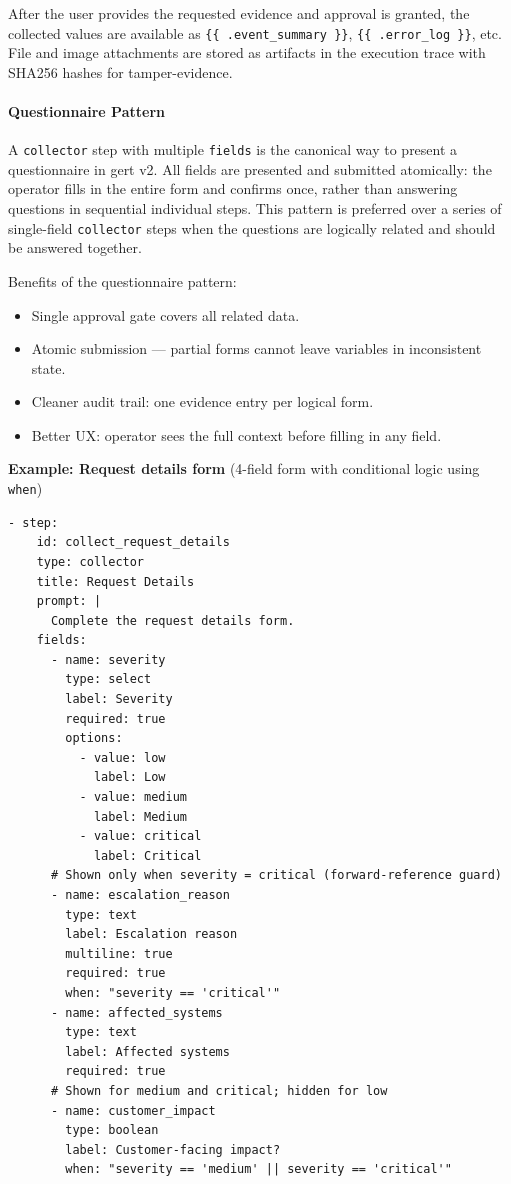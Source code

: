 After the user provides the requested evidence and approval is granted, the
collected values are available as \texttt{\{\{ .event\_summary \}\}},
\texttt{\{\{ .error\_log \}\}}, etc.  File and image attachments are stored as
artifacts in the execution trace with SHA256 hashes for tamper-evidence.

\paragraph{Questionnaire Pattern}
\label{par:questionnaire-pattern}

A \texttt{collector} step with multiple \texttt{fields} is the canonical way
to present a questionnaire in gert v2.  All fields are presented and submitted
atomically: the operator fills in the entire form and confirms once, rather than
answering questions in sequential individual steps.  This pattern is preferred
over a series of single-field \texttt{collector} steps when the questions are
logically related and should be answered together.

Benefits of the questionnaire pattern:
\begin{itemize}
  \item Single approval gate covers all related data.
  \item Atomic submission — partial forms cannot leave variables in inconsistent state.
  \item Cleaner audit trail: one evidence entry per logical form.
  \item Better UX: operator sees the full context before filling in any field.
\end{itemize}

\textbf{Example: Request details form} (4-field form with conditional logic using \texttt{when})

\begin{verbatim}
- step:
    id: collect_request_details
    type: collector
    title: Request Details
    prompt: |
      Complete the request details form.
    fields:
      - name: severity
        type: select
        label: Severity
        required: true
        options:
          - value: low
            label: Low
          - value: medium
            label: Medium
          - value: critical
            label: Critical
      # Shown only when severity = critical (forward-reference guard)
      - name: escalation_reason
        type: text
        label: Escalation reason
        multiline: true
        required: true
        when: "severity == 'critical'"
      - name: affected_systems
        type: text
        label: Affected systems
        required: true
      # Shown for medium and critical; hidden for low
      - name: customer_impact
        type: boolean
        label: Customer-facing impact?
        when: "severity == 'medium' || severity == 'critical'"
\end{verbatim}

